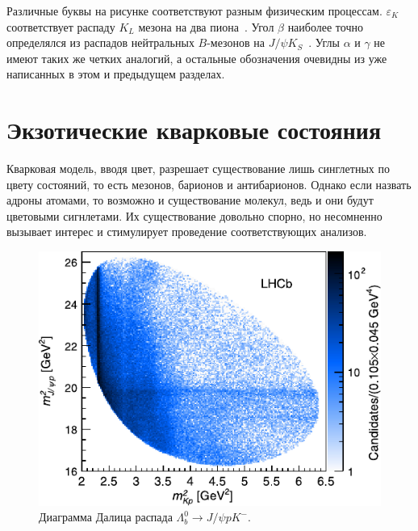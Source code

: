 \documentclass[a4paper, 10pt, twocolumn]{article}
\begin{document}
Различные буквы на рисунке соответствуют разным физическим процессам. 
$\varepsilon_K$ соответствует распаду $K_L$ мезона на два 
пиона~\cite{kaon-CP-violation-new}. Угол $\beta$ наиболее точно 
определялся из распадов нейтральных $B$-мезонов на $J/\psi 
K_S$~\cite{B-CP-violation}. Углы $\alpha$ и $\gamma$ не имеют таких же 
четких аналогий, а остальные обозначения очевидны из уже написанных 
в этом и предыдущем разделах.


\section{Экзотические кварковые состояния}

Кварковая модель, вводя цвет, разрешает существование лишь синглетных 
по цвету состояний, то есть мезонов, барионов и антибарионов. Однако 
если назвать адроны атомами, то возможно и существование молекул, ведь 
и они будут цветовыми сигнлетами. Их существование довольно спорно, но 
несомненно вызывает интерес и стимулирует проведение соответствующих 
анализов.

\begin{figure}[b!]%
	\centering
	\includegraphics[width=\linewidth]{figures/Jpsi-p-Dalitz}
	\caption{Диаграмма Далица распада $\Lambda_b^0 \to J/\psi p K^-$.}
	\label{fig:Jpsip-Dalitz}
\end{figure}%
\end{document}
